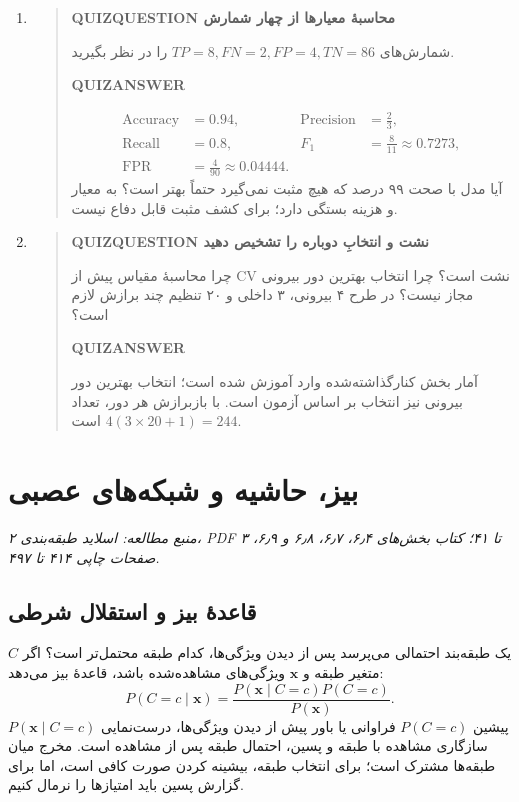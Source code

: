 \begin{enumerate}
\begin{quote}
\end{quote}
\item\begin{quote}\textbf{QUIZQUESTION محاسبهٔ معیارها از چهار شمارش}\par 
شمارش‌های $TP=8,FN=2,FP=4,TN=86$ را در نظر بگیرید.
\par\textbf{QUIZANSWER}\par \begin{align*}
\operatorname{Accuracy}&=0.94,&\operatorname{Precision}&=\frac23,\\
\operatorname{Recall}&=0.8,&F_1&=\frac8{11}\approx0.7273,\\
\operatorname{FPR}&=\frac4{90}\approx0.04444.
\end{align*}
آیا مدل با صحت ۹۹ درصد که هیچ مثبت نمی‌گیرد حتماً بهتر است؟ به معیار و هزینه بستگی دارد؛ برای کشف مثبت قابل دفاع نیست.\par 
\end{quote}
\item\begin{quote}\textbf{QUIZQUESTION نشت و انتخابِ دوباره را تشخیص دهید}\par 
چرا محاسبهٔ مقیاس پیش از CV نشت است؟ چرا انتخاب بهترین دور بیرونی مجاز نیست؟ در طرح ۴ بیرونی، ۳ داخلی و ۲۰ تنظیم چند برازش لازم است؟
\par\textbf{QUIZANSWER}\par آمار بخش کنارگذاشته‌شده وارد آموزش شده است؛ انتخاب بهترین دور بیرونی نیز انتخاب بر اساس آزمون است. با بازبرازش هر دور، تعداد $4(3\times20+1)=244$ است.\par 
\end{quote}
\end{enumerate}


\chapter{بیز، حاشیه و شبکه‌های عصبی}
\textit{منبع مطالعه: اسلاید طبقه‌بندی ۲، PDF ۳ تا ۴۱؛ کتاب بخش‌های ۶٫۴، ۶٫۷، ۶٫۸ و ۶٫۹، صفحات چاپی ۴۱۴ تا ۴۹۷.}\par 
\section{قاعدهٔ بیز و استقلال شرطی}
یک طبقه‌بند احتمالی می‌پرسد پس از دیدن ویژگی‌ها، کدام طبقه محتمل‌تر است؟ اگر $C$ متغیر طبقه و $\mathbf x$ ویژگی‌های مشاهده‌شده باشد، قاعدهٔ بیز می‌دهد:
\[P(C=c\mid\mathbf x)=\frac{P(\mathbf x\mid C=c)P(C=c)}{P(\mathbf x)}.\]
پیشین $P(C=c)$ فراوانی یا باور پیش از دیدن ویژگی‌ها، درست‌نمایی $P(\mathbf x\mid C=c)$ سازگاری مشاهده با طبقه و پسین، احتمال طبقه پس از مشاهده است. مخرج میان طبقه‌ها مشترک است؛ برای انتخاب طبقه، بیشینه کردن صورت کافی است، اما برای گزارش پسین باید امتیازها را نرمال کنیم.

